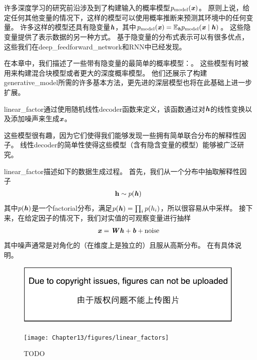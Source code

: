 \chapter{}
\label{chap:linear_factor_models}




许多深度学习的研究前沿涉及到了构建输入的概率模型$p_{\text{model}}(\boldsymbol{\mathit{x}})$。
原则上说，给定任何其他变量的情况下，这样的模型可以使用概率推断来预测其环境中的任何变量。
许多这样的模型还具有隐变量$\boldsymbol{\mathit{h}}$，其中$p_{\text{model}}(\boldsymbol{\mathit{x}}) = \mathbb{E}_{\boldsymbol{\mathit{h}}} p_{\text{model}}(\boldsymbol{\mathit{x}}\mid\boldsymbol{\mathit{h}})$。
这些隐变量提供了表示数据的另一种方式。
 基于隐变量的分布式表示可以有很多优点，这些我们在\gls{deep_feedforward_network}和\gls{RNN}中已经发现。


在本章中，我们描述了一些带有隐变量的最简单的概率模型：。
这些模型有时被用来构建混合块模型\citep{Hinton-nips95,ghahramani96em,Roweis+Saul+Hinton-2002}或者更大的深度概率模型\citep{tang2012deep}。
他们还展示了构建\gls{generative_model}所需的许多基本方法，更先进的深层模型也将在此基础上进一步扩展。


\gls{linear_factor}通过使用随机线性\gls{decoder}函数来定义，该函数通过对$\boldsymbol{\mathit{h}}$的线性变换以及添加噪声来生成$\boldsymbol{\mathit{x}}$。


这些模型很有趣，因为它们使得我们能够发现一些拥有简单联合分布的解释性因子。 
线性\gls{decoder}的简单性使得这些模型（含有隐含变量的模型）能够被广泛研究。


\gls{linear_factor}描述如下的数据生成过程。 
首先，我们从一个分布中抽取解释性因子
\begin{align}
\label{eqn:131}
\mathbf{h} \sim p(\boldsymbol{\mathit{h}})
\end{align}
其中$p(\boldsymbol{\mathit{h}})$是一个\gls{factorial}分布，满足$p(\boldsymbol{\mathit{h}}) = \prod_{i}^{}p(h_i)$，所以很容易从中采样。
接下来，在给定因子的情况下，我们对实值的可观察变量进行抽样
\begin{align}
\label{eqn:132}
\boldsymbol{\mathit{x}} = \boldsymbol{\mathit{W}} \boldsymbol{\mathit{h}} + \boldsymbol{\mathit{b}} + \text{noise}
\end{align}
其中噪声通常是对角化的（在维度上是独立的）且服从高斯分布。
在有具体说明。

\begin{figure}[!htb]
\ifOpenSource
\centerline{\includegraphics{figure.pdf}}
\else
	\centerline{\texttt{[image: Chapter13/figures/linear\_factors]}}
\fi
	\caption{TODO}
	\label{fig:linear_factors}
\end{figure}


